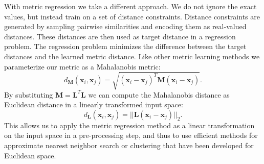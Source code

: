 \documentclass[a4paper,titlepage]{article}
\renewcommand{\vec}[1]{\mathbf{#1}}
\newcommand{\mat}[1]{\mathbf{#1}}
\begin{document}

With metric regression we take a different approach. We do not ignore the exact values, but instead train on a set of distance constraints. Distance constraints are generated by sampling pairwise similarities and encoding them as real-valued distances. These distances are then used as target distance in a regression problem. The regression problem minimizes the difference between the target distances and the learned metric distance. Like other metric learning methods we parameterize our metric as a Mahalanobis metric:  
\begin{equation}
d_{\mat{M}}(\vec{x}_i, \vec{x}_j) = \sqrt{(\vec{x}_i-\vec{x}_j)^T \mat{M} (\vec{x}_i - \vec{x}_j)}.
\label{eq:mahalanobis}
\end{equation}
By substituting $\mat{M} = \mat{L}^T \mat{L}$ we can compute the Mahalanobis distance as Euclidean distance in a linearly transformed input space:
\begin{equation}
d_{\mat{L}}(\vec{x}_i, \vec{x}_j) =  ||\mat{L} (\vec{x}_i - \vec{x}_j)||_2.
\label{eq:mahalanobis_transformation}
\end{equation}
This allows us to apply the metric regression method as a linear transformation on the input space in a pre-processing step, and thus to use efficient methods for approximate nearest neighbor search or clustering that have been developed for Euclidean space. %

\end{document}
